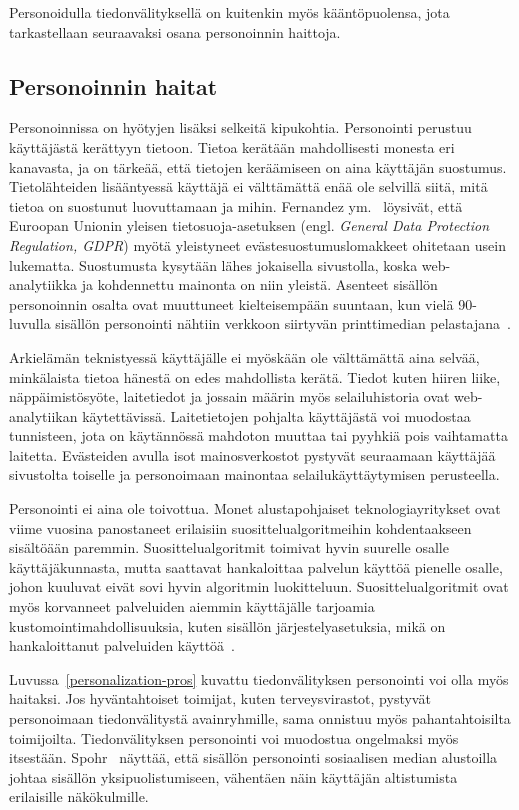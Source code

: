 \documentclass[finnish, 12pt, a4paper, elec, utf8, a-1b, online]{aaltothesis}
\begin{document}
Personoidulla tiedonvälityksellä on kuitenkin myös kääntöpuolensa, jota
tarkastellaan seuraavaksi osana personoinnin haittoja.

\subsection{Personoinnin haitat}\label{personalization-cons}

Personoinnissa on hyötyjen lisäksi selkeitä kipukohtia. Personointi perustuu
käyttäjästä kerättyyn tietoon. Tietoa kerätään mahdollisesti monesta eri
kanavasta, ja on tärkeää, että tietojen keräämiseen on aina käyttäjän suostumus.
Tietolähteiden lisääntyessä käyttäjä ei välttämättä enää ole selvillä siitä,
mitä tietoa on suostunut luovuttamaan ja mihin. Fernandez
ym.~\cite{10.1145/3476087} löysivät, että Euroopan Unionin yleisen
tietosuoja-asetuksen (engl. \textit{General Data Protection Regulation, GDPR})
myötä yleistyneet evästesuostumuslomakkeet ohitetaan usein lukematta.
Suostumusta kysytään lähes jokaisella sivustolla, koska web-analytiikka ja
kohdennettu mainonta on niin yleistä. Asenteet sisällön personoinnin osalta ovat
muuttuneet kielteisempään suuntaan, kun vielä 90-luvulla sisällön personointi
nähtiin verkkoon siirtyvän printtimedian pelastajana~\cite{adams_1995}.

Arkielämän teknistyessä käyttäjälle ei myöskään ole välttämättä aina selvää,
minkälaista tietoa hänestä on edes mahdollista kerätä. Tiedot kuten hiiren
liike, näppäimistösyöte, laitetiedot ja jossain määrin myös selailuhistoria ovat
web-analytiikan käytettävissä. Laitetietojen pohjalta käyttäjästä voi muodostaa
tunnisteen, jota on käytännössä mahdoton muuttaa tai pyyhkiä pois vaihtamatta
laitetta. Evästeiden avulla isot mainosverkostot pystyvät seuraamaan käyttäjää
sivustolta toiselle ja personoimaan mainontaa selailukäyttäytymisen perusteella.

Personointi ei aina ole toivottua. Monet alustapohjaiset teknologiayritykset
ovat viime vuosina panostaneet erilaisiin suosittelualgoritmeihin kohdentaakseen
sisältöään paremmin. Suosittelualgoritmit toimivat hyvin suurelle osalle
käyttäjäkunnasta, mutta saattavat hankaloittaa palvelun käyttöä pienelle osalle,
johon kuuluvat eivät sovi hyvin algoritmin luokitteluun. Suosittelualgoritmit
ovat myös korvanneet palveluiden aiemmin käyttäjälle tarjoamia
kustomointimahdollisuuksia, kuten sisällön järjestelyasetuksia, mikä on
hankaloittanut palveluiden käyttöä~\cite{patel_2022}.

Luvussa~\ref{personalization-pros} kuvattu tiedonvälityksen personointi voi olla
myös haitaksi. Jos hyväntahtoiset toimijat, kuten terveysvirastot, pystyvät
personoimaan tiedonvälitystä avainryhmille, sama onnistuu myös pahantahtoisilta
toimijoilta. Tiedonvälityksen personointi voi muodostua ongelmaksi myös
itsestään. Spohr~\cite{doi:10.1177/0266382117722446} näyttää, että sisällön
personointi sosiaalisen median alustoilla johtaa sisällön yksipuolistumiseen,
vähentäen näin käyttäjän altistumista erilaisille näkökulmille.
\end{document}
